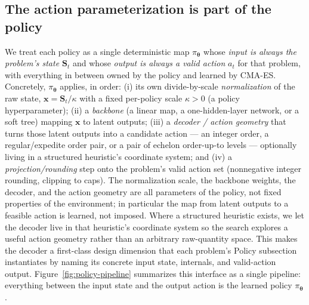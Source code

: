 \documentclass[11pt]{article}
\newcommand{\btheta}{\boldsymbol{\theta}}
\begin{document}
\subsection{The action parameterization is part of the policy}
\label{sec:methods-principle}

We treat each policy as a single deterministic map $\pi_{\btheta}$ whose \emph{input is always the
problem's state $\mathbf S_t$} and whose \emph{output is always a valid action} $a_t$ for that
problem, with everything in between owned by the policy and learned by CMA-ES. Concretely, $\pi_{\btheta}$ applies, in order: (i) its own divide-by-scale \emph{normalization} of the raw state,
$\mathbf{x} = \mathbf{S}_t / \kappa$ with a fixed per-policy scale $\kappa>0$ (a policy
hyperparameter); (ii) a \emph{backbone} (a linear map, a one-hidden-layer
network, or a soft tree) mapping $\mathbf{x}$ to latent outputs; (iii) a \emph{decoder / action geometry} that
turns those latent outputs into a candidate action --- an integer order, a regular/expedite order
pair, or a pair of echelon order-up-to levels --- optionally living in a structured heuristic's
coordinate system; and (iv) a \emph{projection/rounding} step onto the problem's valid action set
(nonnegative integer rounding, clipping to caps). The normalization scale, the backbone weights, the
decoder, and the action geometry are all parameters of the policy, not fixed properties of the
environment; in particular the map from latent outputs to a feasible action is learned, not imposed.
Where a structured heuristic exists, we let the decoder live in that heuristic's coordinate system so
the search explores a useful action geometry rather than an arbitrary raw-quantity space. This makes
the decoder a first-class design dimension that each problem's Policy subsection instantiates by
naming its concrete input state, internals, and valid-action output.
Figure~\ref{fig:policy-pipeline} summarizes this interface as a single pipeline: everything between
the input state and the output action is the learned policy $\pi_{\btheta}$.
\end{document}

